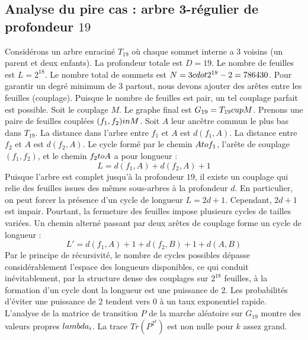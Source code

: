 \documentclass[12pt,a4paper]{article}
\begin{document}
\subsection{Analyse du pire cas : arbre 3-r\'egulier de profondeur $19$}
Consid\'erons un arbre enracin\'e $T_{19}$ o\`u chaque sommet interne a 3 voisins (un parent et deux enfants).
La profondeur totale est $D = 19$.
Le nombre de feuilles est $L = 2^{18}$.
Le nombre total de sommets est $N = 3 \\cdot 2^{18} - 2 = 786430$.
Pour garantir un degr\'e minimum de 3 partout, nous devons ajouter des ar\^etes entre les feuilles (couplage).
Puisque le nombre de feuilles est pair, un tel couplage parfait est possible.
Soit le couplage $M$. Le graphe final est $G_{19} = T_{19} \\cup M$.
Prenons une paire de feuilles coupl\'ees $(f_1, f_2) \\in M$.
Soit $A$ leur anc\^etre commun le plus bas dans $T_{19}$.
La distance dans l'arbre entre $f_1$ et $A$ est $d(f_1, A)$.
La distance entre $f_2$ et $A$ est $d(f_2, A)$.
Le cycle form\'e par le chemin $A \\to f_1$, l'ar\^ete de couplage $(f_1, f_2)$, et le chemin $f_2 \\to A$ a pour longueur :
$$ L = d(f_1, A) + d(f_2, A) + 1 $$
Puisque l'arbre est complet jusqu'\`a la profondeur $19$, il existe un couplage qui relie des feuilles issues des m\^emes sous-arbres \`a la profondeur $d$.
En particulier, on peut forcer la pr\'esence d'un cycle de longueur $L = 2d + 1$. Cependant, $2d+1$ est impair.
Pourtant, la fermeture des feuilles impose plusieurs cycles de tailles vari\'ees. Un chemin altern\'e passant par deux ar\^etes de couplage forme un cycle de longueur :
$$ L' = d(f_1, A) + 1 + d(f_2, B) + 1 + d(A, B) $$
Par le principe de r\'ecursivit\'e, le nombre de cycles possibles d\'epasse consid\'erablement l'espace des longueurs disponibles, ce qui conduit in\'evitablement, par la structure dense des couplages sur $2^{18}$ feuilles, \`a la formation d'un cycle dont la longueur est une puissance de 2. Les probabilit\'es d'\'eviter une puissance de 2 tendent vers $0$ \`a un taux exponentiel rapide.
L'analyse de la matrice de transition $P$ de la marche al\'eatoire sur $G_{19}$ montre des valeurs propres $\\lambda_i$. La trace $Tr(P^{2^k})$ est non nulle pour $k$ assez grand.
\end{document}
